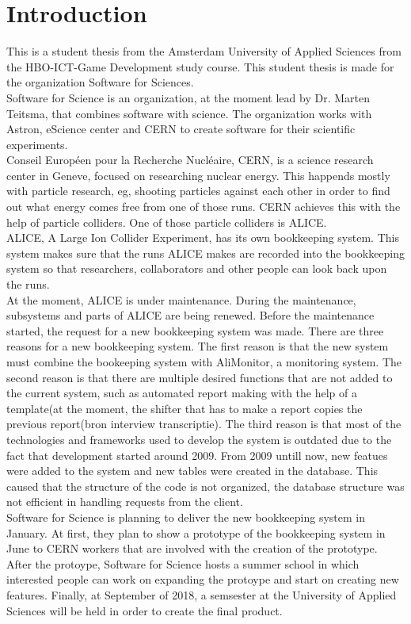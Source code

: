 \documentclass[paper=a4, fontsize=11pt,twoside]{scrartcl}	%
\begin{document}
\section{Introduction}
This is a student thesis from the Amsterdam University of Applied Sciences from the HBO-ICT-Game Development study course. This student thesis is made for the organization Software for Sciences. \\
Software for Science is an organization, at the moment lead by Dr. Marten Teitsma, that combines software with science. The organization works with Astron, eScience center and CERN to create software for their scientific experiments. \\
Conseil Européen pour la Recherche Nucléaire, CERN, is a science research center in Geneve, focused on researching nuclear energy. This happends mostly with particle research, eg, shooting particles against each other in order to find out what energy comes free from one of those runs. CERN achieves this with the help of particle colliders. One of those particle colliders is ALICE. \\
ALICE, A Large Ion Collider Experiment, has its own bookkeeping system. This system makes sure that the runs ALICE makes are recorded into the bookkeeping system so that researchers, collaborators and other people can look back upon the runs.  \\
At the moment, ALICE is under maintenance. During the maintenance, subsystems and parts of ALICE are being renewed. Before the maintenance started, the request for a new bookkeeping system was made. There are three reasons for a new bookkeeping system. The first reason is that the new system must combine the bookeeping system with AliMonitor, a monitoring system. The second reason is that there are multiple desired functions that are not added to the current system, such as automated report making with the help of a template(at the moment, the shifter that has to make a report copies the previous report(bron interview transcriptie). The third reason is that most of the technologies and frameworks used to develop the system is outdated due to the fact that development started around 2009. From 2009 untill now, new featues were added to the system and new tables were created in the database. This caused that the structure of the code is not organized, the database structure was not efficient in handling requests from the client. \\
Software for Science is planning to deliver the new bookkeeping system in January. At first, they plan to show a prototype of the bookkeeping system in June to CERN workers that are involved with the creation of the prototype. After the protoype, Software for Science hosts a summer school in which interested people can work on expanding the protoype and start on creating new features. Finally, at September of 2018, a semsester at the University of Applied Sciences will be held in order to create the final product. \\
\end{document}
